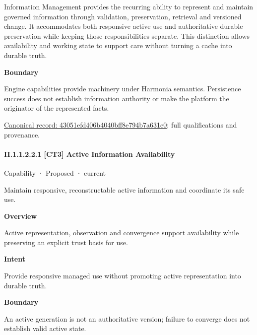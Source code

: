Information Management provides the recurring ability to represent and maintain governed information through validation, preservation, retrieval and versioned change. It accommodates both responsive active use and authoritative durable preservation while keeping those responsibilities separate. This distinction allows availability and working state to support care without turning a cache into durable truth.



\textbf{Boundary}



Engine capabilities provide machinery under Harmonia semantics. Persistence success does not establish information authority or make the platform the originator of the represented facts.


{\footnotesize \href{../../../../continuum/strategy/capability/43051efd406b4040bff8e794b7a631e0.md}{Canonical record: 43051efd406b4040bff8e794b7a631e0}; full qualifications and provenance.}\par
\paragraph*{II.1.1.2.2.1 [CT3] Active Information Availability}
\label{navigation:II.1.1.2.2.1}

\label{element:bb711f4d8fb74af2917869b9b05f7f84}
{\small Capability · Proposed · current}\par

Maintain responsive, reconstructable active information and coordinate its safe use.



\textbf{Overview}



Active representation, observation and convergence support availability while preserving an explicit trust basis for use.



\textbf{Intent}



Provide responsive managed use without promoting active representation into durable truth.



\textbf{Boundary}



An active generation is not an authoritative version; failure to converge does not establish valid active state.


